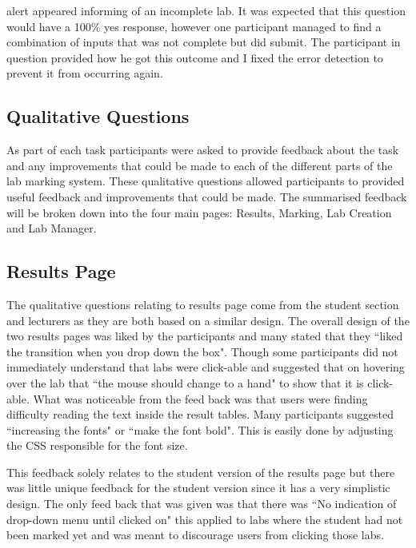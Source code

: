\documentclass[11pt]{report}
\begin{document}
\noindent  alert appeared informing of an incomplete lab. It was expected that this question would have a 100\% yes response, however one participant managed to find a combination of inputs that was not complete but did submit. The participant in question provided how he got this outcome and I fixed the error detection to prevent it from occurring again.


\subsection{Qualitative Questions}

As part of each task participants were asked to provide feedback about the task and any improvements that could be made to each of the different parts of the lab marking system. These qualitative questions allowed participants to provided useful feedback and improvements that could be made. The summarised feedback will be broken down into the four main pages: Results, Marking, Lab Creation and Lab Manager.

\subsection*{Results Page}

The qualitative questions relating to results page come from the student section and lecturers as they are both based on a similar design. The overall design of the two results pages was liked by the participants and many stated that they ``liked the transition when you drop down the box". Though some participants did not immediately understand that labs were click-able and suggested that on hovering over the lab that ``the mouse should change to a hand"  to show that it is click-able. What was noticeable from the feed back was that users were finding difficulty reading the text inside the result tables. Many participants suggested ``increasing the fonts" or ``make the font bold". This is easily done by adjusting the CSS responsible for the font size. 

\noindent This feedback  solely relates to the student version of the results page but there was little unique feedback for the student version since it has a very simplistic design. The only feed back that was given was that there was ``No indication of drop-down menu until clicked on" this applied to labs where the student had not been marked yet and was meant to discourage users from clicking those labs.
\end{document}
